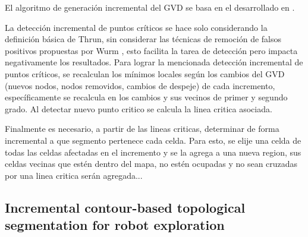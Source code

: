 El algoritmo de generación incremental del GVD se basa en el desarrollado en \cite{kalra2009incremental}. 

La detección incremental de puntos críticos se hace solo considerando la definición básica de Thrun, sin considerar las técnicas de remoción de falsos positivos propuestas por Wurm \cite{wurm2008coordinated}, esto facilita la tarea de detección pero impacta negativamente los resultados. Para lograr la mencionada detección incremental de puntos críticos, se recalculan los mínimos locales según los cambios del GVD (nuevos nodos, nodos removidos, cambios de despeje) de cada incremento, específicamente se recalcula en los cambios y sus vecinos de primer y segundo grado. Al detectar nuevo punto critico se calcula la linea critica asociada.

Finalmente es necesario, a partir de las lineas criticas, determinar de forma incremental a que segmento pertenece cada celda. Para esto, se elije una celda de todas las celdas afectadas en el incremento y se la agrega a una nueva region, sus celdas vecinas que estén dentro del mapa, no estén ocupadas y no sean cruzadas por una linea critica serán agregada...



    




\subsection[Incremental contour-based topological segmentation for robot exploration]{Incremental contour-based topological\\ segmentation for robot exploration}
